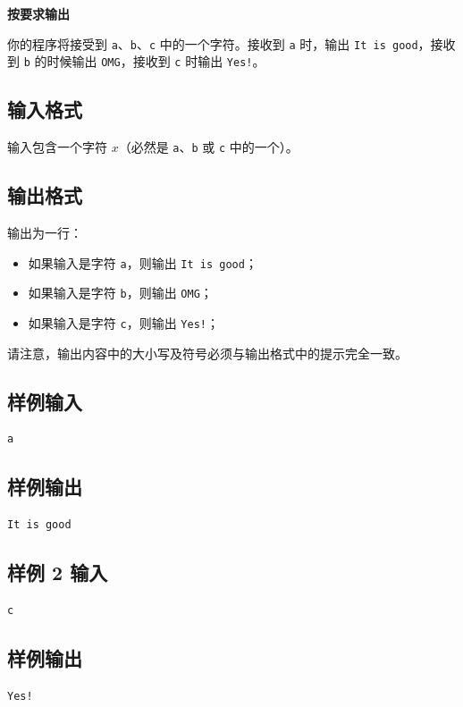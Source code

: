 \documentclass{article}
\newcommand{\problemname}[1]{\begin{center}\Large\bfseries #1\end{center}}
\begin{document}
\problemname{按要求输出}

你的程序将接受到 \texttt{a}、\texttt{b}、\texttt{c} 中的一个字符。接收到 \texttt{a} 时，输出 \texttt{It is good}，接收到 \texttt{b} 的时候输出 \texttt{OMG}，接收到 \texttt{c} 时输出 \texttt{Yes!}。

\subsection*{输入格式}
输入包含一个字符 $x$（必然是 \texttt{a}、\texttt{b} 或 \texttt{c} 中的一个）。

\subsection*{输出格式}
输出为一行：

\begin{itemize}
  \item 如果输入是字符 \texttt{a}，则输出 \texttt{It is good}；

  \item 如果输入是字符 \texttt{b}，则输出 \texttt{OMG}；

  \item 如果输入是字符 \texttt{c}，则输出 \texttt{Yes!}；

\end{itemize}
请注意，输出内容中的大小写及符号必须与输出格式中的提示完全一致。

\subsection*{样例输入}
\begin{verbatim}
a
\end{verbatim}

\subsection*{样例输出}
\begin{verbatim}
It is good
\end{verbatim}

\subsection*{样例 2 输入}
\begin{verbatim}
c
\end{verbatim}

\subsection*{样例输出}
\begin{verbatim}
Yes!
\end{verbatim}
\end{document}

